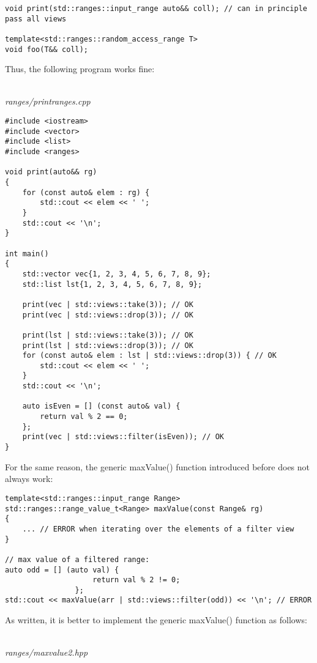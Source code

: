 \begin{lstlisting}[style=styleCXX]
void print(std::ranges::input_range auto&& coll); // can in principle pass all views

template<std::ranges::random_access_range T>
void foo(T&& coll);
\end{lstlisting}

Thus, the following program works fine:

\noindent
\hspace*{\fill} \\ %
\textit{ranges/printranges.cpp}

\begin{lstlisting}[style=styleCXX]
#include <iostream>
#include <vector>
#include <list>
#include <ranges>

void print(auto&& rg)
{
	for (const auto& elem : rg) {
		std::cout << elem << ' ';
	}
	std::cout << '\n';
}

int main()
{
	std::vector vec{1, 2, 3, 4, 5, 6, 7, 8, 9};
	std::list lst{1, 2, 3, 4, 5, 6, 7, 8, 9};
	
	print(vec | std::views::take(3)); // OK
	print(vec | std::views::drop(3)); // OK
	
	print(lst | std::views::take(3)); // OK
	print(lst | std::views::drop(3)); // OK
	for (const auto& elem : lst | std::views::drop(3)) { // OK
		std::cout << elem << ' ';
	}
	std::cout << '\n';
	
	auto isEven = [] (const auto& val) {
		return val % 2 == 0;
	};
	print(vec | std::views::filter(isEven)); // OK
}
\end{lstlisting}

For the same reason, the generic maxValue() function introduced before does not always work:

\begin{lstlisting}[style=styleCXX]
template<std::ranges::input_range Range>
std::ranges::range_value_t<Range> maxValue(const Range& rg)
{
	... // ERROR when iterating over the elements of a filter view
}

// max value of a filtered range:
auto odd = [] (auto val) {
					return val % 2 != 0;
				};
std::cout << maxValue(arr | std::views::filter(odd)) << '\n'; // ERROR
\end{lstlisting}

As written, it is better to implement the generic maxValue() function as follows:

\noindent
\hspace*{\fill} \\ %
\textit{ranges/maxvalue2.hpp}

